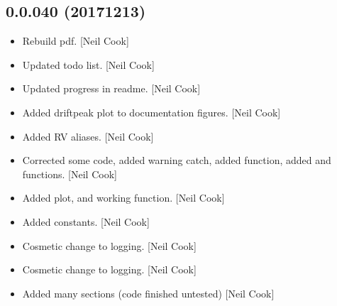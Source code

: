 \documentclass[a4paper,10pt,english]{report}
\begin{document}
\subsection{0.0.040 (2017\sphinxhyphen{}12\sphinxhyphen{}13)}
\label{\detokenize{misc/changelog:id530}}\begin{itemize}
\item {} 
Rebuild pdf. {[}Neil Cook{]}

\item {} 
Updated todo list. {[}Neil Cook{]}

\item {} 
Updated progress in readme. {[}Neil Cook{]}

\item {} 
Added drift\sphinxhyphen{}peak plot to documentation figures. {[}Neil Cook{]}

\item {} 
Added RV aliases. {[}Neil Cook{]}

\item {} 
Corrected some code, added warning catch, added  function,
added  and  functions. {[}Neil Cook{]}

\item {} 
Added  plot,  and working
function. {[}Neil Cook{]}

\item {} 
Added  constants. {[}Neil Cook{]}

\item {} 
Cosmetic change to logging. {[}Neil Cook{]}

\item {} 
Cosmetic change to logging. {[}Neil Cook{]}

\item {} 
Added many sections (code finished \sphinxhyphen{} untested) {[}Neil Cook{]}

\end{itemize}
\end{document}
